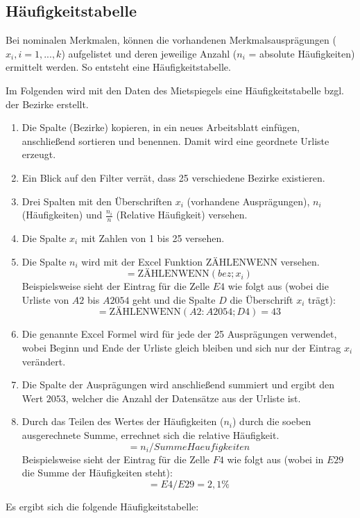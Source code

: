 \subsection{Häufigkeitstabelle}
Bei nominalen Merkmalen, können die vorhandenen Merkmalsausprägungen ($x_i,i=1,...,k$) aufgelistet
und deren jeweilige Anzahl ($n_i$ = absolute Häufigkeiten) ermittelt werden.
So entsteht eine Häufigkeitstabelle.

Im Folgenden wird mit den Daten des Mietspiegels eine Häufigkeitstabelle bzgl. der Bezirke erstellt.

\begin{enumerate}
  \item Die Spalte  (Bezirke) kopieren, in ein neues Arbeitsblatt einfügen, anschließend
  sortieren und benennen. Damit wird eine geordnete Urliste erzeugt.
  \item Ein Blick auf den Filter verrät, dass 25 verschiedene Bezirke existieren.
  \item Drei Spalten mit den Überschriften $x_i$ (vorhandene Ausprägungen), $n_i$ (Häufigkeiten) und
  $\frac{n_i}{n}$ (Relative Häufigkeit) versehen.
  \item Die Spalte $x_i$ mit Zahlen von 1 bis 25 versehen.
  \item Die Spalte $n_i$ wird mit der Excel Funktion $\text{ZÄHLENWENN}$ versehen.
  \[=\text{ZÄHLENWENN}(bez;x_i)\] Beispielsweise sieht der
  Eintrag für die Zelle $E4$ wie folgt aus (wobei die Urliste von $A2$ bis $A2054$ geht und
  die Spalte $D$ die Überschrift $x_i$ trägt): \[=\text{ZÄHLENWENN}(A2:A2054;D4)=43\]
  \item Die genannte Excel Formel wird für jede der 25 Ausprägungen verwendet, wobei Beginn und Ende
  der Urliste gleich bleiben und sich nur der Eintrag $x_i$ verändert.
  \item Die Spalte der Ausprägungen wird anschließend summiert und ergibt den Wert $2053$, welcher
  die Anzahl der Datensätze aus der Urliste ist.
  \item Durch das Teilen des Wertes der Häufigkeiten ($n_i$) durch die soeben
  ausgerechnete Summe, errechnet sich die relative Häufigkeit. \[=n_i/SummeHaeufigkeiten\]
  Beispielsweise sieht der Eintrag für die Zelle $F4$ wie folgt aus (wobei in $E29$ die Summe der
  Häufigkeiten steht): \[=E4/E29=2,1\%\]
\end{enumerate} 
 
\newpage
Es ergibt sich die folgende Häufigkeitstabelle:

